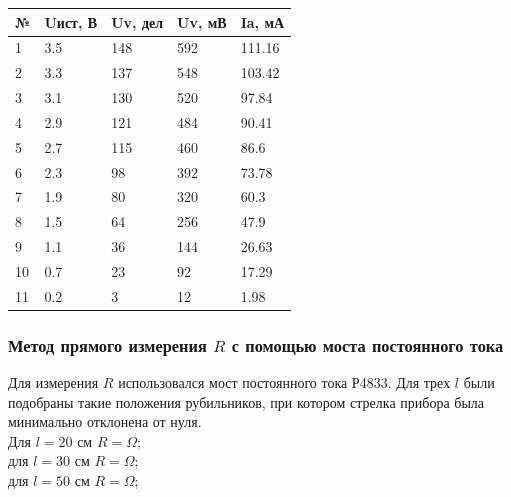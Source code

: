 \documentclass{article}
\begin{document}
	\begin{table}[!ht]
		\centering
		\begin{tabular}{|l|l|l|l|l|}
			\hline
			№ & Uист, В & Uv, дел & Uv, мВ & Ia, мА \\ \hline
			1 & 3.5 & 148 & 592 & 111.16 \\ \hline
			2 & 3.3 & 137 & 548 & 103.42 \\ \hline
			3 & 3.1 & 130 & 520 & 97.84 \\ \hline
			4 & 2.9 & 121 & 484 & 90.41 \\ \hline
			5 & 2.7 & 115 & 460 & 86.6 \\ \hline
			6 & 2.3 & 98 & 392 & 73.78 \\ \hline
			7 & 1.9 & 80 & 320 & 60.3 \\ \hline
			8 & 1.5 & 64 & 256 & 47.9 \\ \hline
			9 & 1.1 & 36 & 144 & 26.63 \\ \hline
			10 & 0.7 & 23 & 92 & 17.29 \\ \hline
			11 & 0.2 & 3 & 12 & 1.98 \\ \hline
		\end{tabular}
	\end{table}
	
	\subsubsection{Метод прямого измерения $R$ с помощью моста постоянного тока}
	Для измерения $R$ использовался мост постоянного тока Р4833. Для трех $l$ были подобраны такие положения рубильников, при котором стрелка прибора была минимально отклонена от нуля.\\
	Для $l = 20 \text{ см}$ $R = \Omega$;\\
	для $l = 30 \text{ см}$ $R = \Omega$;\\
	для $l = 50 \text{ см}$ $R = \Omega$;\\
	
	
	
	
\end{document}
